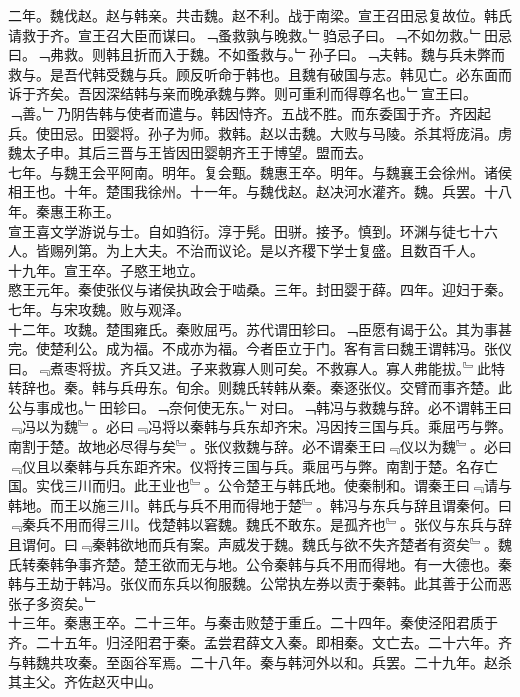 \documentclass{zhvt-classic}
\begin{document}
\hspace*{2em}二年。魏伐赵。赵与韩亲。共击魏。赵不利。战于南梁。宣王召田忌复故位。韩氏请救于齐。宣王召大臣而谋曰。﹁蚤救孰与晚救。﹂驺忌子曰。﹁不如勿救。﹂田忌曰。﹁弗救。则韩且折而入于魏。不如蚤救与。﹂孙子曰。﹁夫韩。魏与兵未弊而救与。是吾代韩受魏与兵。顾反听命于韩也。且魏有破国与志。韩见亡。必东面而诉于齐矣。吾因深结韩与亲而晚承魏与弊。则可重利而得尊名也。﹂宣王曰。﹁善。﹂乃阴告韩与使者而遣与。韩因恃齐。五战不胜。而东委国于齐。齐因起兵。使田忌。田婴将。孙子为师。救韩。赵以击魏。大败与马陵。杀其将庞涓。虏魏太子申。其后三晋与王皆因田婴朝齐王于博望。盟而去。\\
\hspace*{2em}七年。与魏王会平阿南。明年。复会甄。魏惠王卒。明年。与魏襄王会徐州。诸侯相王也。十年。楚围我徐州。十一年。与魏伐赵。赵决河水灌齐。魏。兵罢。十八年。秦惠王称王。\\
\hspace*{2em}宣王喜文学游说与士。自如驺衍。淳于髡。田骈。接予。慎到。环渊与徒七十六人。皆赐列第。为上大夫。不治而议论。是以齐稷下学士复盛。且数百千人。\\
\hspace*{2em}十九年。宣王卒。子愍王地立。\\
\hspace*{2em}愍王元年。秦使张仪与诸侯执政会于啮桑。三年。封田婴于薛。四年。迎妇于秦。七年。与宋攻魏。败与观泽。\\
\hspace*{2em}十二年。攻魏。楚围雍氏。秦败屈丐。苏代谓田轸曰。﹁臣愿有谒于公。其为事甚完。使楚利公。成为福。不成亦为福。今者臣立于门。客有言曰魏王谓韩冯。张仪曰。﹃煮枣将拔。齐兵又进。子来救寡人则可矣。不救寡人。寡人弗能拔。﹄此特转辞也。秦。韩与兵毋东。旬余。则魏氏转韩从秦。秦逐张仪。交臂而事齐楚。此公与事成也。﹂田轸曰。﹁奈何使无东。﹂对曰。﹁韩冯与救魏与辞。必不谓韩王曰﹃冯以为魏﹄。必曰﹃冯将以秦韩与兵东却齐宋。冯因抟三国与兵。乘屈丐与弊。南割于楚。故地必尽得与矣﹄。张仪救魏与辞。必不谓秦王曰﹃仪以为魏﹄。必曰﹃仪且以秦韩与兵东距齐宋。仪将抟三国与兵。乘屈丐与弊。南割于楚。名存亡国。实伐三川而归。此王业也﹄。公令楚王与韩氏地。使秦制和。谓秦王曰﹃请与韩地。而王以施三川。韩氏与兵不用而得地于楚﹄。韩冯与东兵与辞且谓秦何。曰﹃秦兵不用而得三川。伐楚韩以窘魏。魏氏不敢东。是孤齐也﹄。张仪与东兵与辞且谓何。曰﹃秦韩欲地而兵有案。声威发于魏。魏氏与欲不失齐楚者有资矣﹄。魏氏转秦韩争事齐楚。楚王欲而无与地。公令秦韩与兵不用而得地。有一大德也。秦韩与王劫于韩冯。张仪而东兵以徇服魏。公常执左券以责于秦韩。此其善于公而恶张子多资矣。﹂\\
\hspace*{2em}十三年。秦惠王卒。二十三年。与秦击败楚于重丘。二十四年。秦使泾阳君质于齐。二十五年。归泾阳君于秦。孟尝君薛文入秦。即相秦。文亡去。二十六年。齐与韩魏共攻秦。至函谷军焉。二十八年。秦与韩河外以和。兵罢。二十九年。赵杀其主父。齐佐赵灭中山。\\
\end{document}
